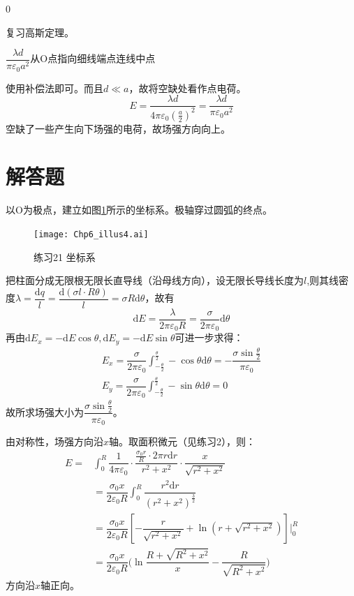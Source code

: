 \documentclass[b5paper,opensource,sourcefont,parskip]{qyxf-book}
\newcommand{\di}[1]{\mathrm{d}#1}
\begin{document}
0

\solve
复习高斯定理。

$\dfrac{\lambda d}{\pi\varepsilon_0 a^2}$\quad 从O点指向细线端点连线中点

\solve
使用补偿法即可。而且$d\ll a$，故将空缺处看作点电荷。
\[
E=\dfrac{\lambda d}{4\pi\varepsilon_0{(\frac{a}{2})}^2}=\dfrac{\lambda d}{\pi\varepsilon_0 a^2}
\]
空缺了一些产生向下场强的电荷，故场强方向向上。

\section{解答题}



\solve
以O为极点，建立如图\ref{fig:c6-t21}所示的坐标系。极轴穿过圆弧的终点。
\begin{figure}[!htbp]
	\centering
	\texttt{[image: Chp6\_illus4.ai]}
	\caption{练习21 坐标系}\label{fig:c6-t21}
\end{figure}
把柱面分成无限根无限长直导线（沿母线方向），设无限长导线长度为$l$,则其线密度$\lambda=\dfrac{\di{q}}{l}=\dfrac{\di{(\sigma l\cdot R\theta)}}{l}=\sigma R\di{\theta}$，故有
\[\di{E}=\dfrac{\lambda}{2\pi\varepsilon_0R}=\dfrac{\sigma}{2\pi\varepsilon_0}\di{\theta}\]
再由$\di{E_x}=-\di{E}\cos\theta,\di{E_y}=-\di{E}\sin\theta$可进一步求得：
\begin{gather*}
	E_x=\dfrac{\sigma}{2\pi\varepsilon_0}\int_{-\frac{\theta}{2}}^{\frac{\theta}{2}}-\cos\theta\di{\theta}=-\dfrac{\sigma\sin\frac{\theta}{2}}{\pi\varepsilon_0}\\
	E_y=\dfrac{\sigma}{2\pi\varepsilon_0}\int_{-\frac{\theta}{2}}^{\frac{\theta}{2}}-\sin\theta\di{\theta}=0
\end{gather*}
故所求场强大小为$\dfrac{\sigma\sin\frac{\theta}{2}}{\pi\varepsilon_0}$。


\solve
由对称性，场强方向沿$x$轴。取面积微元（见练习2），则：
\begin{align*}
	E=&\int_0^R\dfrac{1}{4\pi\varepsilon_0}\cdot\dfrac{\frac{\sigma_0r}{R}\cdot 2\pi r\di{r}}{r^2+x^2}\cdot\dfrac{x}{\sqrt{r^2+x^2}}\\
	&=\dfrac{\sigma_0x}{2\varepsilon_0R}\int_0^R\dfrac{r^2\di{r}}{{(r^2+x^2)}^\frac{3}{2}}\\
	&=\dfrac{\sigma_0x}{2\varepsilon_0R}[-\dfrac{r}{\sqrt{r^2+x^2}}+\ln(r+\sqrt{r^2+x^2})]\Big|_0^R\\
	&=\dfrac{\sigma_0x}{2\varepsilon_0R}\big(\ln\dfrac{R+\sqrt{R^2+x^2}}{x}-\dfrac{R}{\sqrt{R^2+x^2}}\big)
\end{align*}
方向沿$x$轴正向。
\end{document}
